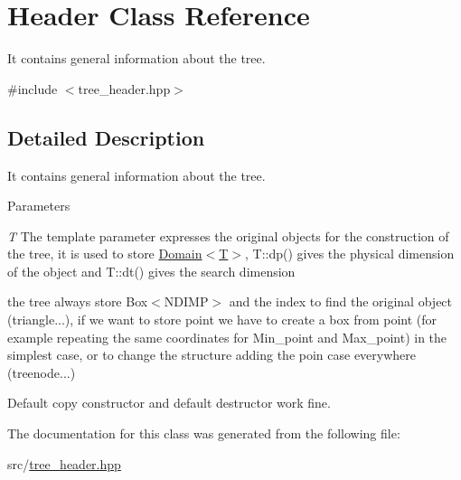\hypertarget{classHeader}{
\section{Header Class Reference}
\label{classHeader}
}


It contains general information about the tree.  


{\ttfamily \#include $<$tree\_\-header.hpp$>$}

\subsection{Detailed Description}
It contains general information about the tree. 
\begin{DoxyParams}{Parameters}
\item[{\em T}]The template parameter expresses the original objects for the construction of the tree, it is used to store \hyperlink{classDomain}{Domain$<$T$>$}, T::dp() gives the physical dimension of the object and T::dt() gives the search dimension \par
 the tree always store Box$<$NDIMP$>$ and the index to find the original object (triangle...), if we want to store point we have to create a box from point (for example repeating the same coordinates for Min\_\-point and Max\_\-point) in the simplest case, or to change the structure adding the poin case everywhere (treenode...)\end{DoxyParams}
Default copy constructor and default destructor work fine. 

The documentation for this class was generated from the following file:\begin{DoxyCompactItemize}
\item 
src/\hyperlink{tree__header_8hpp}{tree\_\-header.hpp}\end{DoxyCompactItemize}
